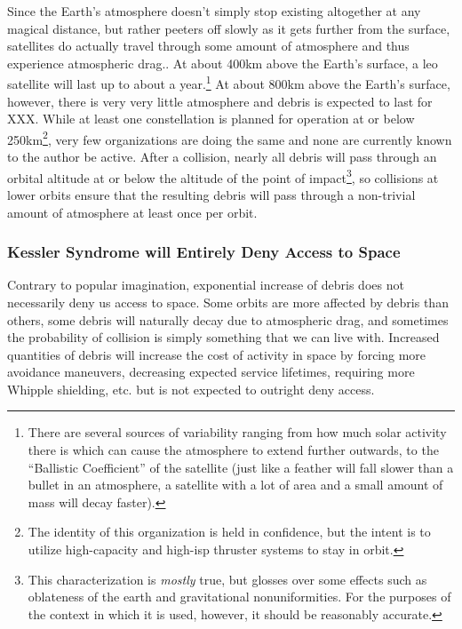 Since the Earth's atmosphere doesn't simply stop existing altogether
at any magical distance, but rather peeters off slowly as it gets
further from the surface, satellites do actually travel through some
amount of atmosphere and thus experience atmospheric drag.\cite[good
  survey of orbit decay]{xxx}.  At about 400km above the Earth's
surface, a \ac{leo} satellite will last up to about a
year.\footnote{There are several sources of variability ranging from
how much solar activity there is which can cause the atmosphere to
extend further outwards, to the ``Ballistic Coefficient'' of the
satellite (just like a feather will fall slower than a bullet in an
atmosphere, a satellite with a lot of area and a small amount of mass
will decay faster).}\cite[probably same survey]{xxx} At about 800km
above the Earth's surface, however, there is very very little
atmosphere and debris is expected to last for XXX.\cite[analysis of
  fengyun using the dread model]{xxx} While at least one constellation
is planned for operation at or below 250km\footnote{The identity of
this organization is held in confidence, but the intent is to utilize
high-capacity and high-isp thruster systems to stay in orbit.}, very
few organizations are doing the same and none are currently known to
the author be active.  After a collision, nearly all debris will pass
through an orbital altitude at or below the altitude of the point of
impact\footnote{This characterization is \emph{mostly} true, but
glosses over some effects such as oblateness of the earth and
gravitational nonuniformities.  For the purposes of the context in
which it is used, however, it should be reasonably accurate.}, so
collisions at lower orbits ensure that the resulting debris will pass
through a non-trivial amount of atmosphere at least once per orbit.

\subsubsection{Kessler Syndrome will Entirely Deny Access to Space}
Contrary to popular imagination, exponential increase of debris does
not necessarily deny us access to space.  Some orbits are more
affected by debris than others, some debris will naturally decay due
to atmospheric drag, and sometimes the probability of collision is
simply something that we can live with.  Increased quantities of
debris will increase the cost of activity in space by forcing more
avoidance maneuvers, decreasing expected service lifetimes, requiring
more Whipple shielding, etc. but is not expected to outright deny
access.

